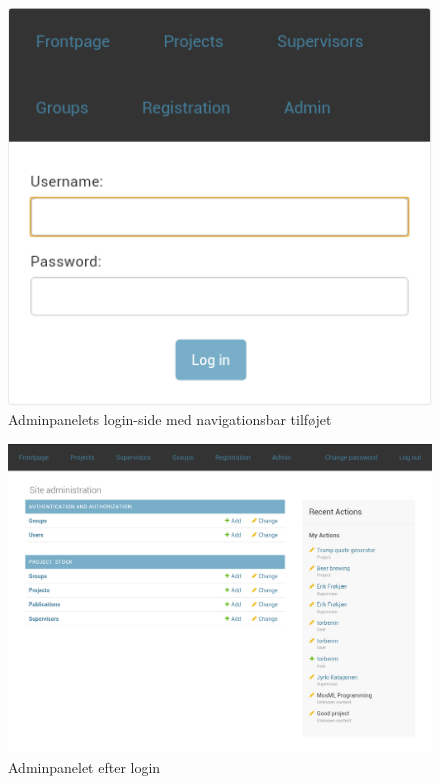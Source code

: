 \documentclass[12pt]{article}
\begin{document}
\begin{figure}[H]
    \centering
    \includegraphics[scale=0.5]{frontend_admin_login.png}
    \caption{Adminpanelets login-side med navigationsbar tilføjet}
    \label{fig:frontend_admin_login}
\end{figure}
\begin{figure}[H]
    \centering
    \includegraphics[scale=0.35]{frontend_admin.png}
    \caption{Adminpanelet efter login}
    \label{fig:frontend_admin}
\end{figure}
\end{document}
